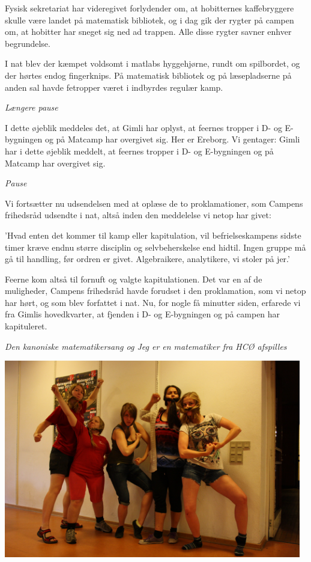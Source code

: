 \begin{minipage}[t]{170mm}
Fysisk sekretariat har videregivet forlydender om, at hobitternes kaffebryggere skulle være landet på matematisk bibliotek, og i dag gik der rygter på campen om, at hobitter har sneget sig ned ad trappen. Alle disse rygter savner enhver begrundelse.

I nat blev der kæmpet voldsomt i matlabs hyggehjørne, rundt om spilbordet, og der hørtes endog fingerknips. På matematisk bibliotek og på læsepladserne på anden sal havde fetropper været i indbyrdes regulær kamp.

\emph{Længere pause}

I dette øjeblik meddeles det, at Gimli har oplyst, at feernes tropper i D- og E-bygningen og på Matcamp har overgivet sig. Her er Ereborg. Vi gentager: Gimli har i dette øjeblik meddelt, at feernes tropper i D- og E-bygningen og på Matcamp har overgivet sig.

\emph{Pause}

Vi fortsætter nu udsendelsen med at oplæse de to proklamationer, som Campens frihedsråd udsendte i nat, altså inden den meddelelse vi netop har givet:

'Hvad enten det kommer til kamp eller kapitulation, vil befrielseskampens sidste timer kræve endnu større disciplin og selvbeherskelse end hidtil. Ingen gruppe må gå til handling, før ordren er givet. Algebraikere, analytikere, vi stoler på jer.'

Feerne kom altså til fornuft og valgte kapitulationen. Det var en af de muligheder, Campens frihedsråd havde forudset i den proklamation, som vi netop har hørt, og som blev forfattet i nat. Nu, for nogle få minutter siden, erfarede vi fra Gimlis hovedkvarter, at fjenden i D- og E-bygningen og på campen har kapituleret.

\emph{Den kanoniske matematikersang og Jeg er en matematiker fra HCØ afspilles}

\begin{center}
\vspace{3mm}
\includegraphics[width=130mm]{dvaergetropper.jpg}
\end{center}
\end{minipage}
